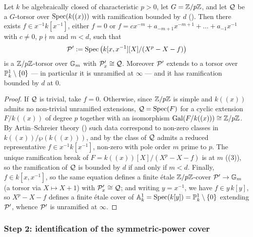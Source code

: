 \begin{lemma}\label{lemma:realization_over_Gm_AS}
    Let $k$ be algebraically closed of characteristic $p > 0$, let $G = \mathbb{Z}/p\mathbb{Z}$,
    and let $\mathcal{Q}$ be a $G$-torsor over $\operatorname{Spec}(k((x)))$ with ramification bounded
    by $d$ (). Then there exists
    $f \in x^{-1}k[x^{-1}]$, either $f = 0$ or
    $f = cx^{-m} + a_{-m+1}x^{-m+1} + \dots + a_{-1}x^{-1}$ with $c \neq 0$,
    $p \nmid m$ and $m < d$, such that
    $$\mathcal{P}' := \operatorname{Spec}\left(k[x, x^{-1}][X]/(X^p - X - f)\right)$$
    is a $\mathbb{Z}/p\mathbb{Z}$-torsor over $\mathbb{G}_m$ with $\mathcal{P}'_x \cong \mathcal{Q}$. Moreover $\mathcal{P}'$
    extends to a torsor over $\mathbb{P}^1_k \setminus \{0\}$ --- in particular it is
    unramified at $\infty$ --- and it has ramification bounded by $d$ at $0$.
\end{lemma}
\begin{proof}
    If $\mathcal{Q}$ is trivial, take $f = 0$. Otherwise, since $\mathbb{Z}/p\mathbb{Z}$ is simple and
    $k((x))$ admits no non-trivial unramified extensions, $\mathcal{Q} = \operatorname{Spec}(F)$ for a
    cyclic extension $F/k((x))$ of degree $p$ together with an isomorphism
    $\operatorname{Gal}(F/k((x))) \cong \mathbb{Z}/p\mathbb{Z}$. By Artin--Schreier theory
    () such data correspond to non-zero
    classes in $k((x))/\wp(k((x)))$, and by
     the class of $\mathcal{Q}$ admits a reduced
    representative $f \in x^{-1}k[x^{-1}]$, non-zero with pole order $m$ prime to
    $p$. The unique ramification break of $F = k((x))[X]/(X^p - X - f)$ is at
    $m$ ((3)), so the ramification of
    $\mathcal{Q}$ is bounded by $d$ if and only if $m < d$.
    Finally, $f \in k[x, x^{-1}]$, so the same equation defines a finite étale
    $\mathbb{Z}/p\mathbb{Z}$-cover $\mathcal{P}' \to \mathbb{G}_m$ (a torsor via $X \mapsto X + 1$) with
    $\mathcal{P}'_x \cong \mathcal{Q}$; and writing $y = x^{-1}$, we have $f \in y\,k[y]$, so
    $X^p - X - f$ defines a finite étale cover of
    $\mathbb{A}^1_k = \operatorname{Spec}(k[y]) = \mathbb{P}^1_k \setminus \{0\}$ extending $\mathcal{P}'$,
    whence $\mathcal{P}'$ is unramified at $\infty$.
\end{proof}

\subsubsection*{Step 2: identification of the symmetric-power cover}


